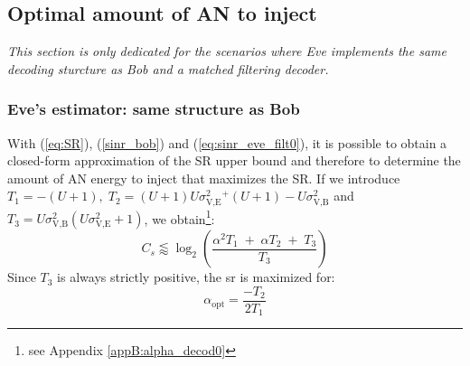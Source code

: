 \subsection{Optimal amount of AN to inject}
\label{subsec:best_alpha}
\textit{This section is only dedicated for the scenarios where Eve implements the same decoding sturcture as Bob and a matched filtering decoder.}

\subsubsection{Eve's estimator: same structure as Bob}
With (\ref{eq:SR}), (\ref{sinr_bob}) and (\ref{eq:sinr_eve_filt0}), it is possible to obtain a closed-form approximation of the SR upper bound and therefore to determine the amount of AN energy to inject that maximizes the SR. If we introduce $T_1=-(U+1),  \; T_2 = (U+1)U\sigma_{\text{V,E}}^2^ + (U+1) - U\sigma_{\text{V,B}}^2 $ and $T_3 = U\sigma_{\text{V,B}}^2(U\sigma_{\text{V,E}}^2+1)$, we obtain\footnote{see Appendix \ref{appB:alpha_decod0}}:
\begin{equation}
C_s \lessapprox \log_2 \left( \frac{\alpha^2 T_1 \; + \; \alpha T_2 \; + \; T_3}{T_3} \right)
\label{eq:SR_anal2_decod_0}
\end{equation}
Since $T_3$ is always strictly positive, the \gls{sr} is maximized for:
\begin{equation}
	\alpha_{\text{opt}} = \frac{-T_2}{2T_1}
	\label{eq:optimal_alpha_decod_0}
\end{equation}



